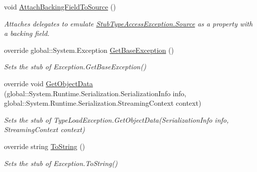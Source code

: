 \begin{DoxyCompactItemize}
void \hyperlink{class_system_1_1_fakes_1_1_stub_type_access_exception_a979e7e7eb3a6dac1345e505a736e4726}{Attach\-Backing\-Field\-To\-Source} ()
\begin{DoxyCompactList}\small\item\em Attaches delegates to emulate \hyperlink{class_system_1_1_fakes_1_1_stub_type_access_exception_adc066ac664f7eef130e218607a334d6e}{Stub\-Type\-Access\-Exception.\-Source} as a property with a backing field.\end{DoxyCompactList}\item 
override global\-::\-System.\-Exception \hyperlink{class_system_1_1_fakes_1_1_stub_type_access_exception_a8d511ca823150df79a2b92527ba06e54}{Get\-Base\-Exception} ()
\begin{DoxyCompactList}\small\item\em Sets the stub of Exception.\-Get\-Base\-Exception()\end{DoxyCompactList}\item 
override void \hyperlink{class_system_1_1_fakes_1_1_stub_type_access_exception_a73d83fab1f859ac2962942a69c4e2b7b}{Get\-Object\-Data} (global\-::\-System.\-Runtime.\-Serialization.\-Serialization\-Info info, global\-::\-System.\-Runtime.\-Serialization.\-Streaming\-Context context)
\begin{DoxyCompactList}\small\item\em Sets the stub of Type\-Load\-Exception.\-Get\-Object\-Data(\-Serialization\-Info info, Streaming\-Context context)\end{DoxyCompactList}\item 
override string \hyperlink{class_system_1_1_fakes_1_1_stub_type_access_exception_ae78351272787fa27c5d7859fe58cc1d0}{To\-String} ()
\begin{DoxyCompactList}\small\item\em Sets the stub of Exception.\-To\-String()\end{DoxyCompactList}\end{DoxyCompactItemize}

